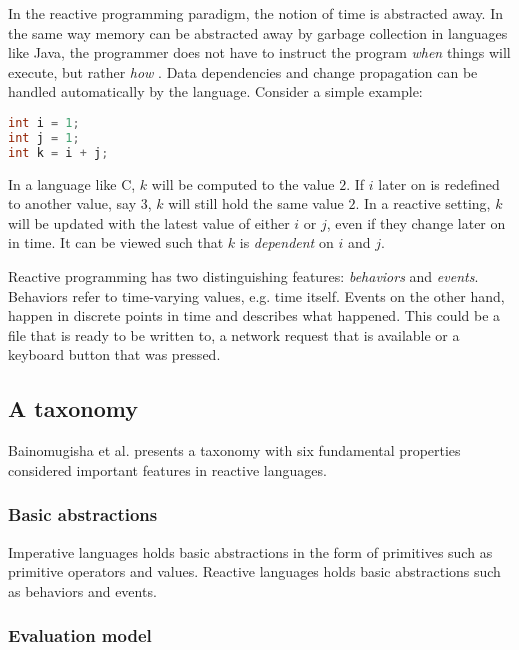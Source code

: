 In the reactive programming paradigm, the notion of time is abstracted away. In
the same way memory can be abstracted away by garbage collection in languages
like Java, the programmer does not have to instruct the program \textit{when}
things will execute, but rather \textit{how} \cite{bainomugisha2013survey}.
Data dependencies and change propagation can be handled automatically by the
language. Consider a simple example:

\begin{lstlisting}[language=C]
int i = 1;
int j = 1;
int k = i + j;
\end{lstlisting}

In a language like C, $k$ will be computed to the value $2$. If $i$ later on is
redefined to another value, say $3$, $k$ will still hold the same value $2$. In
a reactive setting, $k$ will be updated with the latest value of either $i$ or
$j$, even if they change later on in time. It can be viewed such that $k$ is
\textit{dependent} on $i$ and $j$. \cite{bainomugisha2013survey}

Reactive programming has two distinguishing features: \textit{behaviors} and
\textit{events}. Behaviors refer to time-varying values, e.g. time itself.
Events on the other hand, happen in discrete points in time and describes what
happened. This could be a file that is ready to be written to, a network
request that is available or a keyboard button that was pressed.
\cite{bainomugisha2013survey}

\subsection{A taxonomy}

Bainomugisha et al. \cite{bainomugisha2013survey} presents a taxonomy with six
fundamental properties considered important features in reactive languages.

\subsubsection{Basic abstractions}

Imperative languages holds basic abstractions in the form of primitives such as
primitive operators and values. Reactive languages holds basic abstractions
such as behaviors and events.

\subsubsection{Evaluation model}
\label{sec:evaluation-model}

